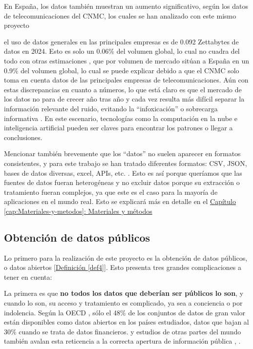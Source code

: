 En España, los datos también muestran un aumento significativo, según los datos de telecomunicaciones del CNMC, los cuales se han analizado con este mismo proyecto \citep{DatosGeneralesCNMC} 

el uso de datos generales en las principales empresas es de 0.092 Zettabytes de datos en 2024.
Esto es solo un 0.06\% del volumen global, lo cual no cuadra del todo con otras estimaciones \citep{DatosMercadosEspanna}, que por volumen de mercado sitúan a España en un 0.9\% del volumen global, lo cual se puede explicar debido a que el CNMC solo toma en cuenta datos de las principales empresas de telecomunicaciones. 
Aún con estas discrepancias en cuanto a números, lo que está claro es que el mercado de los datos no para de crecer año tras año y cada vez resulta más difícil separar la información relevante del ruido, evitando la ``infoxicación'' o sobrecarga informativa \citep{Infoxicacion}. En este escenario, tecnologías como la computación en la nube e inteligencia artificial pueden ser claves para encontrar los patrones o llegar a conclusiones.

Mencionar también brevemente que los ``datos'' no suelen aparecer en formatos consistentes, y para este trabajo se han tratado diferentes formatos: CSV, JSON, bases de datos diversas, excel, APIs, etc. \citep{khan2019fileFormats}. Esto es así porque queríamos que las fuentes de datos fueran heterogéneas y no excluir datos porque su extracción o tratamiento fueran complejos, ya que este es el caso para la mayoría de aplicaciones en el mundo real. Esto se explicará más en detalle en el \hyperref[cap:Materiales-y-metodos]{Capítulo \ref*{cap:Materiales-y-metodos}: Materiales y métodos} \\ %


\subsection{Obtención de datos públicos}
	
	Lo primero para la realización de este proyecto es la obtención de datos públicos, o datos abiertos \hyperref[def4]{[Definición \ref*{def4}]}. Esto presenta tres grandes complicaciones a tener en cuenta:
	
	La primera es que \textbf{no todos los datos que deberían ser públicos lo son}, y cuando lo son, su acceso y tratamiento es complicado, ya sea a conciencia o por indolencia. Según la OECD \citep{OECD2023openData}, sólo el 48\% de los conjuntos de datos de gran valor están disponibles como datos abiertos en los países estudiados, datos que bajan al 30\% cuando se trata de datos financieros. y estudios de otras partes del mundo también avalan esta reticencia a la correcta apertura de información pública \citep{TransparenciaEcuador}, \citep{TransparenciaMexico}.
	
